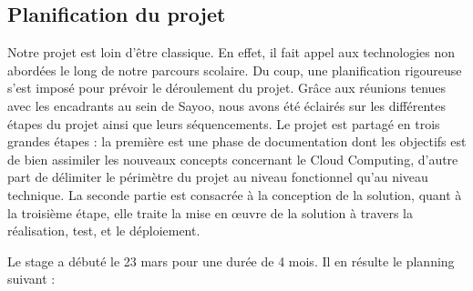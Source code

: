 \begin{onehalfspace}
\section{Planification du projet}

Notre projet est loin d'être classique. En effet, il fait appel aux technologies non abordées le long de notre parcours scolaire. Du coup, une planification rigoureuse s'est imposé pour prévoir le déroulement du projet. Grâce aux réunions tenues avec les encadrants au sein de Sayoo, nous avons été éclairés sur les différentes étapes du projet ainsi que leurs séquencements. Le projet est partagé en trois grandes étapes : la première est une phase de documentation dont les objectifs est de bien assimiler les nouveaux concepts concernant le Cloud Computing, d'autre part de délimiter le périmètre du projet au niveau fonctionnel qu'au niveau technique. La seconde partie est consacrée à la conception de la solution, quant à la troisième étape, elle traite la mise en œuvre de la solution à travers la réalisation, test, et le déploiement.

Le stage a débuté le 23 mars pour une durée de 4 mois. Il en résulte le planning suivant :


\end{onehalfspace}
